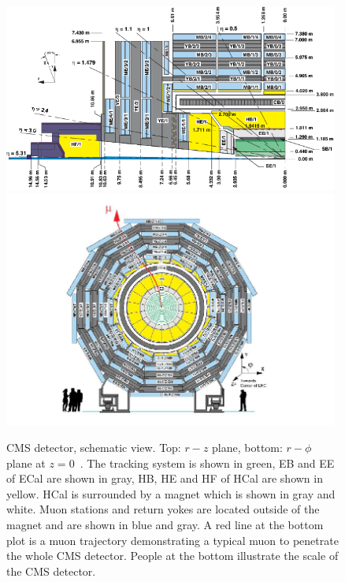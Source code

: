 \begin{figure}[htb]
  \begin{center}
    {\includegraphics[width=0.98\textwidth]{../figs/Exp/CMSview1.png}\\
     \includegraphics[width=0.98\textwidth]{../figs/Exp/CMSview.png}}
    \caption{CMS detector, schematic view. Top: $r-z$ plane, bottom: $r-\phi$ plane at $z=0$~\cite{ref_CMSschemView}. The tracking system is shown in green, EB and EE of ECal are shown in gray, HB, HE and HF of HCal are shown in yellow. HCal is surrounded by a magnet which is shown in gray and white. Muon stations and return yokes are located outside of the magnet and are shown in blue and gray. A red line at the bottom plot is a muon trajectory demonstrating a typical muon to penetrate the whole CMS detector. People at the bottom illustrate the scale of the CMS detector.}
    \label{fig:CMSschemView}
  \end{center}
\end{figure}

